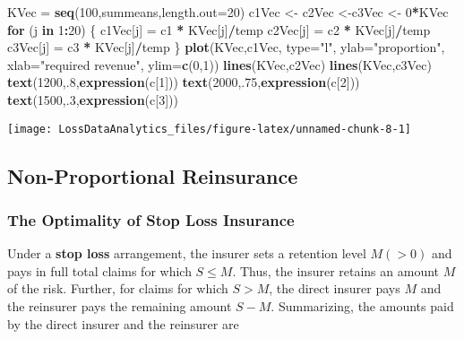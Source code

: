 \documentclass[]{book}
\newenvironment{Shaded}{\begin{snugshade}}{\end{snugshade}}
\newcommand{\KeywordTok}[1]{\textcolor[rgb]{0.13,0.29,0.53}{\textbf{#1}}}
\newcommand{\DataTypeTok}[1]{\textcolor[rgb]{0.13,0.29,0.53}{#1}}
\newcommand{\DecValTok}[1]{\textcolor[rgb]{0.00,0.00,0.81}{#1}}
\newcommand{\StringTok}[1]{\textcolor[rgb]{0.31,0.60,0.02}{#1}}
\newcommand{\ControlFlowTok}[1]{\textcolor[rgb]{0.13,0.29,0.53}{\textbf{#1}}}
\newcommand{\OperatorTok}[1]{\textcolor[rgb]{0.81,0.36,0.00}{\textbf{#1}}}
\newcommand{\NormalTok}[1]{#1}
\theoremstyle{definition}
\theoremstyle{definition}
\theoremstyle{definition}
\theoremstyle{remark}
\begin{document}
\begin{Shaded}
\begin{Highlighting}[]
\NormalTok{KVec =}\StringTok{ }\KeywordTok{seq}\NormalTok{(}\DecValTok{100}\NormalTok{,summeans,}\DataTypeTok{length.out=}\DecValTok{20}\NormalTok{)}
\NormalTok{c1Vec <-}\StringTok{ }\NormalTok{c2Vec <-c3Vec <-}\StringTok{ }\DecValTok{0}\OperatorTok{*}\NormalTok{KVec }
\ControlFlowTok{for}\NormalTok{ (j }\ControlFlowTok{in} \DecValTok{1}\OperatorTok{:}\DecValTok{20}\NormalTok{) \{}
\NormalTok{  c1Vec[j] =}\StringTok{ }\NormalTok{c1 }\OperatorTok{*}\StringTok{ }\NormalTok{KVec[j]}\OperatorTok{/}\NormalTok{temp}
\NormalTok{  c2Vec[j] =}\StringTok{ }\NormalTok{c2 }\OperatorTok{*}\StringTok{ }\NormalTok{KVec[j]}\OperatorTok{/}\NormalTok{temp}
\NormalTok{  c3Vec[j] =}\StringTok{ }\NormalTok{c3 }\OperatorTok{*}\StringTok{ }\NormalTok{KVec[j]}\OperatorTok{/}\NormalTok{temp}
\NormalTok{  \}}
\KeywordTok{plot}\NormalTok{(KVec,c1Vec, }\DataTypeTok{type=}\StringTok{"l"}\NormalTok{, }\DataTypeTok{ylab=}\StringTok{"proportion"}\NormalTok{, }\DataTypeTok{xlab=}\StringTok{"required revenue"}\NormalTok{, }\DataTypeTok{ylim=}\KeywordTok{c}\NormalTok{(}\DecValTok{0}\NormalTok{,}\DecValTok{1}\NormalTok{))}
\KeywordTok{lines}\NormalTok{(KVec,c2Vec)}
\KeywordTok{lines}\NormalTok{(KVec,c3Vec)}
\KeywordTok{text}\NormalTok{(}\DecValTok{1200}\NormalTok{,.}\DecValTok{8}\NormalTok{,}\KeywordTok{expression}\NormalTok{(c[}\DecValTok{1}\NormalTok{]))}
\KeywordTok{text}\NormalTok{(}\DecValTok{2000}\NormalTok{,.}\DecValTok{75}\NormalTok{,}\KeywordTok{expression}\NormalTok{(c[}\DecValTok{2}\NormalTok{]))}
\KeywordTok{text}\NormalTok{(}\DecValTok{1500}\NormalTok{,.}\DecValTok{3}\NormalTok{,}\KeywordTok{expression}\NormalTok{(c[}\DecValTok{3}\NormalTok{]))}
\end{Highlighting}
\end{Shaded}

\begin{center}\texttt{[image: LossDataAnalytics\_files/figure-latex/unnamed-chunk-8-1]} \end{center}

\subsection{Non-Proportional Reinsurance}\label{S:NonProportionalRe}

\subsubsection{The Optimality of Stop Loss
Insurance}\label{the-optimality-of-stop-loss-insurance}

Under a \textbf{stop loss} arrangement, the insurer sets a retention
level \(M (>0)\) and pays in full total claims for which \(S \le M\).
Thus, the insurer retains an amount \(M\) of the risk. Further, for
claims for which \(S > M\), the direct insurer pays \(M\) and the
reinsurer pays the remaining amount \(S-M\). Summarizing, the amounts
paid by the direct insurer and the reinsurer are
\end{document}

